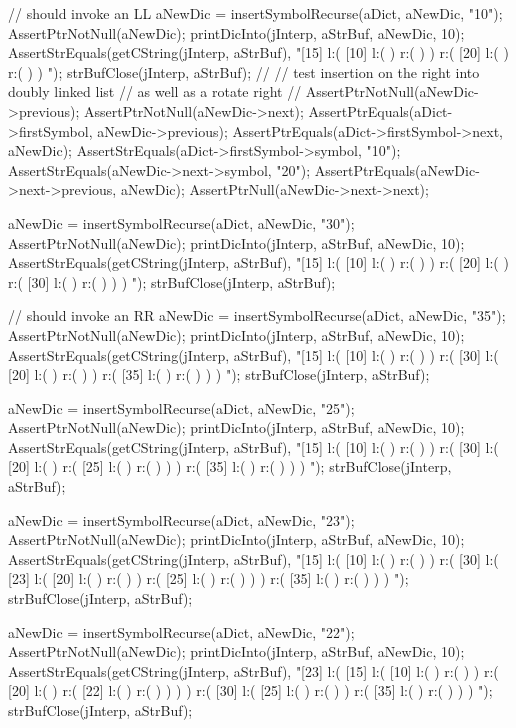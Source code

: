  // should invoke an LL
  aNewDic = insertSymbolRecurse(aDict, aNewDic, "10");
  AssertPtrNotNull(aNewDic);
  printDicInto(jInterp, aStrBuf, aNewDic, 10);
  AssertStrEquals(getCString(jInterp, aStrBuf),
  "[15] l:( [10] l:(  ) r:(  )  ) r:( [20] l:(  ) r:(  )  ) ");
  strBufClose(jInterp, aStrBuf);
  //
  // test insertion on the right into doubly linked list
  // as well as a rotate right
  //
  AssertPtrNotNull(aNewDic->previous);
  AssertPtrNotNull(aNewDic->next);
  AssertPtrEquals(aDict->firstSymbol, aNewDic->previous);
  AssertPtrEquals(aDict->firstSymbol->next, aNewDic);
  AssertStrEquals(aDict->firstSymbol->symbol, "10");
  AssertStrEquals(aNewDic->next->symbol, "20");
  AssertPtrEquals(aNewDic->next->previous, aNewDic);
  AssertPtrNull(aNewDic->next->next);

  aNewDic = insertSymbolRecurse(aDict, aNewDic, "30");
  AssertPtrNotNull(aNewDic);
  printDicInto(jInterp, aStrBuf, aNewDic, 10);
  AssertStrEquals(getCString(jInterp, aStrBuf),
  "[15] l:( [10] l:(  ) r:(  )  ) r:( [20] l:(  ) r:( [30] l:(  ) r:(  )  )  ) ");
  strBufClose(jInterp, aStrBuf);
  
  // should invoke an RR
  aNewDic = insertSymbolRecurse(aDict, aNewDic, "35");
  AssertPtrNotNull(aNewDic);
  printDicInto(jInterp, aStrBuf, aNewDic, 10);
  AssertStrEquals(getCString(jInterp, aStrBuf),
  "[15] l:( [10] l:(  ) r:(  )  ) r:( [30] l:( [20] l:(  ) r:(  )  ) r:( [35] l:(  ) r:(  )  )  ) ");
  strBufClose(jInterp, aStrBuf);

  aNewDic = insertSymbolRecurse(aDict, aNewDic, "25");
  AssertPtrNotNull(aNewDic);
  printDicInto(jInterp, aStrBuf, aNewDic, 10);
  AssertStrEquals(getCString(jInterp, aStrBuf),
  "[15] l:( [10] l:(  ) r:(  )  ) r:( [30] l:( [20] l:(  ) r:( [25] l:(  ) r:(  )  )  ) r:( [35] l:(  ) r:(  )  )  ) ");
  strBufClose(jInterp, aStrBuf);

  aNewDic = insertSymbolRecurse(aDict, aNewDic, "23");
  AssertPtrNotNull(aNewDic);
  printDicInto(jInterp, aStrBuf, aNewDic, 10);
  AssertStrEquals(getCString(jInterp, aStrBuf),
  "[15] l:( [10] l:(  ) r:(  )  ) r:( [30] l:( [23] l:( [20] l:(  ) r:(  )  ) r:( [25] l:(  ) r:(  )  )  ) r:( [35] l:(  ) r:(  )  )  ) ");
  strBufClose(jInterp, aStrBuf);
  
  aNewDic = insertSymbolRecurse(aDict, aNewDic, "22");
  AssertPtrNotNull(aNewDic);
  printDicInto(jInterp, aStrBuf, aNewDic, 10);
  AssertStrEquals(getCString(jInterp, aStrBuf),
  "[23] l:( [15] l:( [10] l:(  ) r:(  )  ) r:( [20] l:(  ) r:( [22] l:(  ) r:(  )  )  )  ) r:( [30] l:( [25] l:(  ) r:(  )  ) r:( [35] l:(  ) r:(  )  )  ) ");
  strBufClose(jInterp, aStrBuf);
  
